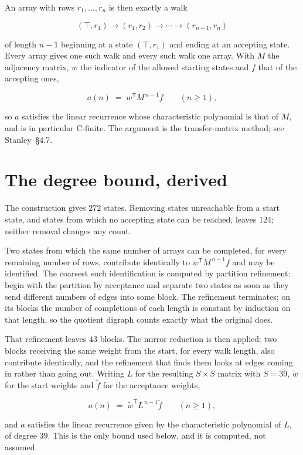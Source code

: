 \documentclass[11pt]{article}
\theoremstyle{definition}
\begin{document}
An array with rows $r_1,\dots,r_n$ is then exactly a walk

\[(\top,r_1) \to (r_1,r_2) \to \cdots \to (r_{n-1},r_n)\]

of length $n-1$ beginning at a state $(\top,r_1)$ and ending at an accepting state. Every array gives one such walk and every such walk one array. With $M$ the adjacency matrix, $w$ the indicator of the allowed starting states and $f$ that of the accepting ones,

\[a(n) \;=\; w^{\mathsf T} M^{\,n-1} f \qquad (n \ge 1),\]

so $a$ satisfies the linear recurrence whose characteristic polynomial is that of $M$, and is in particular C-finite. The argument is the transfer-matrix method; see Stanley~\S4.7.

\section{The degree bound, derived}

The construction gives $272$ states. Removing states unreachable from a start state, and states from which no accepting state can be reached, leaves $124$; neither removal changes any count.

Two states from which the same number of arrays can be completed, for every remaining number of rows, contribute identically to $w^{\mathsf T}M^{\,n-1}f$ and may be identified. The coarsest such identification is computed by partition refinement: begin with the partition by acceptance and separate two states as soon as they send different numbers of edges into some block. The refinement terminates; on its blocks the number of completions of each length is constant by induction on that length, so the quotient digraph counts exactly what the original does.

That refinement leaves $43$ blocks. The mirror reduction is then applied: two blocks receiving the same weight from the start, for every walk length, also contribute identically, and the refinement that finds them looks at edges coming in rather than going out. Writing $L$ for the resulting $S \times S$ matrix with $S = 39$, $\tilde w$ for the start weights and $\tilde f$ for the acceptance weights,

\[a(n) \;=\; \tilde w^{\mathsf T} L^{\,n-1} \tilde f \qquad (n \ge 1),\]

and $a$ satisfies the linear recurrence given by the characteristic polynomial of $L$, of degree $39$. This is the only bound used below, and it is computed, not assumed.
\end{document}
